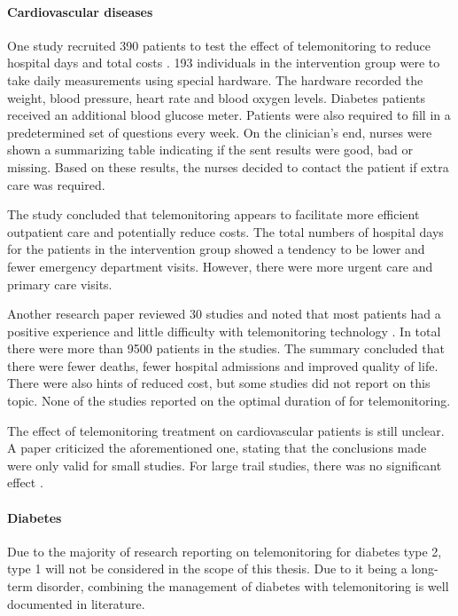         \paragraph{Cardiovascular diseases} One study recruited 390 patients to test the effect of telemonitoring to reduce hospital days and total costs \cite{tompkins2010randomized}. 193 individuals in the intervention group were to take daily measurements using special hardware. The hardware recorded the weight, blood pressure, heart rate and blood oxygen levels. Diabetes patients received an additional blood glucose meter. Patients were also required to fill in a predetermined set of questions every week. On the clinician's end, nurses were shown a summarizing table indicating if the sent results were good, bad or missing. Based on these results, the nurses decided to contact the patient if extra care was required.

        The study concluded that telemonitoring appears to facilitate more efficient outpatient care and potentially reduce costs. The total numbers of hospital days for the patients in the intervention group showed a tendency to be lower and fewer emergency department visits. However, there were more urgent care and primary care visits.

        Another research paper reviewed 30 studies and noted that most patients had a positive experience and little difficulty with telemonitoring technology \cite{inglis2010structured}. In total there were more than 9500 patients in the studies. The summary concluded that there were fewer deaths, fewer hospital admissions and improved quality of life. There were also hints of reduced cost, but some studies did not report on this topic. None of the studies reported on the optimal duration of for telemonitoring.
        
        The effect of telemonitoring treatment on cardiovascular patients is still unclear. A paper criticized the aforementioned one, stating that the conclusions made were only valid for small studies. For large trail studies, there was no significant effect \cite{chaudhry2010telemonitoring}.

        \paragraph{Diabetes} Due to the majority of research reporting on telemonitoring for diabetes type 2, type 1 will not be considered in the scope of this thesis. Due to it being a long-term disorder, combining the management of diabetes with telemonitoring is well documented in literature.

